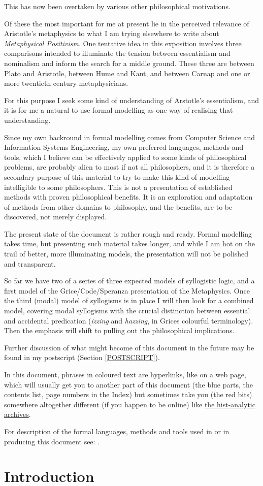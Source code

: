 \documentclass[11pt]{article}
\begin{document}
This has now been overtaken by various other philosophical motivations.

Of these the most important for me at present lie in the perceived relevance of Aristotle's metaphysics to what I am trying elsewhere to write about {\it Metaphysical Positivism}.
One tentative idea in this exposition involves three comparisons intended to illuminate the tension between essentialism and nominalism and inform the search for a middle ground.
These three are between Plato and Aristotle, between Hume and Kant, and between Carnap and one or more twentieth century metaphysicians.

For this purpose I seek some kind of understanding of Arstotle's essentialism, and it is for me a natural to use formal modelling as one way of realising that understanding.

Since my own backround in formal modelling comes from Computer Science and Information Systems Engineering, my own preferred languages, methods and tools, which I believe can be effectively applied to some kinds of philosophical problems, are probably alien to most if not all philosophers, and it is therefore a secondary purpose of this material to try to make this kind of modelling intelligible to some philosophers.
This is not a presentation of established methods with proven philosophical benefits.
It is an exploration and adaptation of methods from other domains to philosophy, and the benefits, are to be discovered, not merely displayed.

The present state of the document is rather rough and ready.
Formal modelling takes time, but presenting such material takes longer, and while I am hot on the trail of better, more illuminating models, the presentation will not be polished and transparent.

So far we have two of a series of three expected models of syllogistic logic, and a first model of the Grice/Code/Speranza presentation of the Metaphysics.
Once the third (modal) model of syllogisms is in place I will then look for a combined model, covering modal syllogisms with the crucial distinction between essential and accidental predication ({\it izzing} and {\it hazzing}, in Grices colourful terminology).
Then the emphasis will shift to pulling out the philosophical implications.

Further discussion of what might become of this document in the future may be found in my postscript (Section \ref{POSTSCRIPT}).

In this document, phrases in coloured text are hyperlinks, like on a web page, which will usually get you to another part of this document (the blue parts, the contents list, page numbers in the Index) but sometimes take you (the red bits) somewhere altogether different (if you happen to be online) like \href{http://rbjones.com/pipermail/hist-analytic_rbjones.com}{the hist-analytic archives}.

For description of the formal languages, methods and tools used in or in producing this document see: \cite{rbjt029}.

\section{Introduction}
\end{document}

